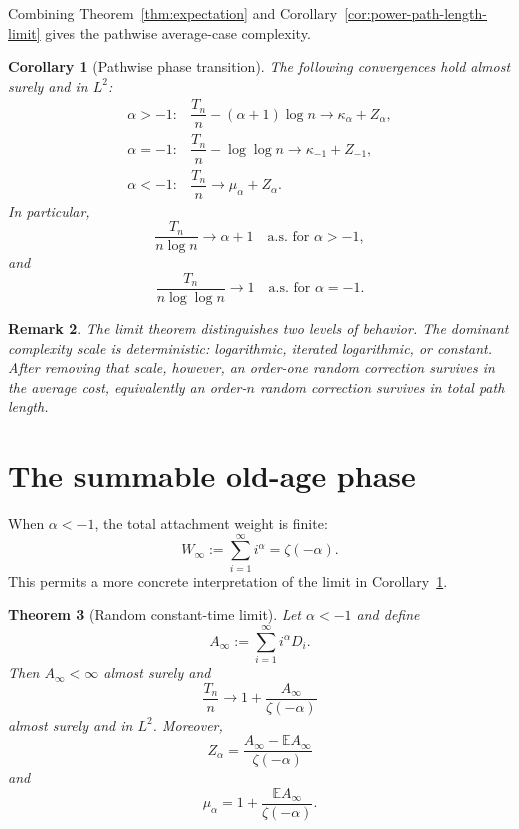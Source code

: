 \documentclass[11pt,a4paper]{article}
\newtheorem{theorem}{Theorem}[section]
\newtheorem{corollary}[theorem]{Corollary}
\newtheorem{remark}[theorem]{Remark}
\newcommand{\E}{\mathbb{E}}
\newcommand{\1}{\mathbf{1}}
\begin{document}
Combining Theorem~\ref{thm:expectation} and
Corollary~\ref{cor:power-path-length-limit} gives the pathwise average-case complexity.

\begin{corollary}[Pathwise phase transition]\label{cor:pathwise}
The following convergences hold almost surely and in $L^2$:
\[
\begin{array}{lll}
\alpha>-1:
&
\dfrac{T_n}{n}-(\alpha+1)\log n
\longrightarrow
\kappa_\alpha+Z_\alpha,
\\[4mm]
\alpha=-1:
&
\dfrac{T_n}{n}-\log\log n
\longrightarrow
\kappa_{-1}+Z_{-1},
\\[4mm]
\alpha<-1:
&
\dfrac{T_n}{n}
\longrightarrow
\mu_\alpha+Z_\alpha.
\end{array}
\]
In particular,
\[
\frac{T_n}{n\log n}\to\alpha+1
\quad\text{a.s. for }\alpha>-1,
\]
and
\[
\frac{T_n}{n\log\log n}\to1
\quad\text{a.s. for }\alpha=-1.
\]
\end{corollary}

\begin{remark}
The limit theorem distinguishes two levels of behavior.  The dominant
complexity scale is deterministic: logarithmic, iterated logarithmic, or
constant.  After removing that scale, however, an order-one random correction
survives in the average cost, equivalently an order-$n$ random correction
survives in total path length.
\end{remark}

\section{The summable old-age phase}\label{sec:oldage}

When $\alpha<-1$, the total attachment weight is finite:
\[
W_\infty
:=
\sum_{i=1}^\infty i^\alpha
=
\zeta(-\alpha).
\]
This permits a more concrete interpretation of the limit in
Corollary~\ref{cor:pathwise}.

\begin{theorem}[Random constant-time limit]\label{thm:old-random}
Let $\alpha<-1$ and define
\[
A_\infty
:=
\sum_{i=1}^\infty i^\alpha D_i.
\]
Then $A_\infty<\infty$ almost surely and
\begin{equation}\label{eq:old-pathwise}
\frac{T_n}{n}
\longrightarrow
1+\frac{A_\infty}{\zeta(-\alpha)}
\end{equation}
almost surely and in $L^2$.
Moreover,
\[
Z_\alpha
=
\frac{A_\infty-\E A_\infty}{\zeta(-\alpha)}
\]
and
\[
\mu_\alpha
=
1+\frac{\E A_\infty}{\zeta(-\alpha)}.
\]
\end{theorem}
\end{document}
